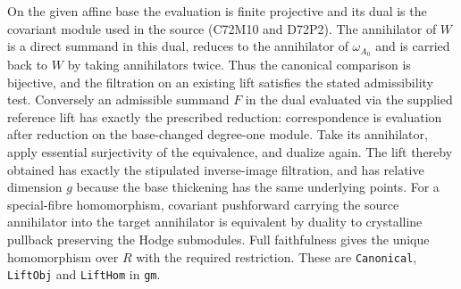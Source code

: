 On the given affine base the evaluation is finite projective and
its dual is the covariant module used in the source (C72M10 and
D72P2). The annihilator of $W$ is a direct summand in this dual,
reduces to the annihilator of $\omega_{A_0}$ and is carried back
to $W$ by taking annihilators twice. Thus the canonical comparison
is bijective, and the filtration on an existing lift satisfies the
stated admissibility test. Conversely an admissible summand $F$ in
the dual evaluated via the supplied reference lift has exactly the
prescribed reduction: correspondence is evaluation after reduction
on the base-changed degree-one module. Take its annihilator, apply
essential surjectivity of the equivalence, and dualize again. The
lift thereby obtained has exactly the stipulated inverse-image
filtration, and has relative dimension $g$ because the base thickening
has the same underlying points. For a special-fibre homomorphism,
covariant pushforward carrying the source annihilator into the
target annihilator is equivalent by duality to crystalline pullback
preserving the Hodge submodules. Full faithfulness gives the unique
homomorphism over $R$ with the required restriction. These are
\texttt{Canonical}, \texttt{LiftObj} and \texttt{LiftHom} in
\texttt{gm}.
